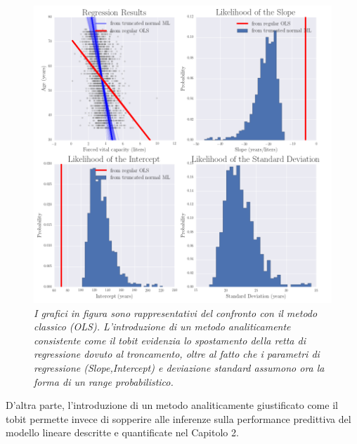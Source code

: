 \documentclass[12pt,openright,twoside,a4paper]{book}
\begin{document}
\begin{figure}[!h]
\centering
\includegraphics[width=1.0\linewidth]{truncatedml}
\caption{\textit{I grafici in figura sono rappresentativi del confronto con il metodo classico (OLS).
L'introduzione di un metodo analiticamente consistente come il tobit evidenzia lo spostamento della retta di regressione dovuto al troncamento, oltre al fatto che i parametri di regressione (Slope,Intercept) e deviazione standard assumono ora la forma di un range probabilistico.}}
\label{truncatedml}
\end{figure}

D'altra parte, l'introduzione di un metodo analiticamente giustificato come il tobit permette invece di sopperire alle inferenze sulla performance predittiva del modello lineare descritte e quantificate nel Capitolo 2.
\end{document}
